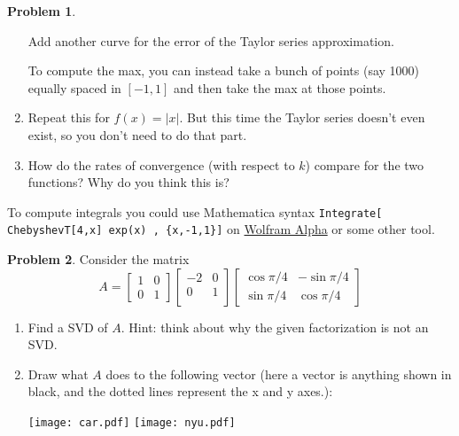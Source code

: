 \documentclass[12pt]{article}
\theoremstyle{definition}
\newtheorem{problem}{Problem}
\begin{document}
\begin{problem}
\begin{enumerate}
        Add another curve for the error of the Taylor series approximation.
        
        To compute the max, you can instead take a bunch of points (say 1000) equally spaced in $[-1,1]$ and then take the max at those points.

        \item Repeat this for $f(x) = |x|$. But this time the Taylor series doesn't even exist, so you don't need to do that part.
        
        \item How do the rates of convergence (with respect to $k$) compare for the two functions? Why do you think this is?
    \end{enumerate}

    To compute integrals you could use Mathematica syntax \texttt{Integrate[ ChebyshevT[4,x] exp(x) , \{x,-1,1\}]} on 
    \href{https://www.wolframalpha.com/input?i=Integrate%5B+ChebyshevT%5B4%2Cx%5D+exp%28x%29+%2C+%7Bx%2C-1%2C1%7D%5D}{Wolfram Alpha} or some other tool. 
    \end{problem}


\begin{problem}
    Consider the matrix 
        \[
            A 
            = 
            \begin{bmatrix}
                1 & 0 \\
                0 & 1
            \end{bmatrix}
            \begin{bmatrix}
                -2 & 0 \\ 0 & 1 \\
            \end{bmatrix}
            \begin{bmatrix}
                \cos \pi/4 & -\sin \pi/4 \\
                \sin \pi/4 & \cos \pi/4
            \end{bmatrix}
        \]
        \begin{enumerate}
            \item Find a SVD of ${A}$. Hint: think about why the given factorization is not an SVD.
            \item Draw what ${A}$ does to the following vector (here a vector is anything shown in black, and the dotted lines represent the x and y axes.):
                
            \texttt{[image: car.pdf]}
            \hfill
            \texttt{[image: nyu.pdf]}
        
        \end{enumerate}
    
\end{problem}
\end{document}
